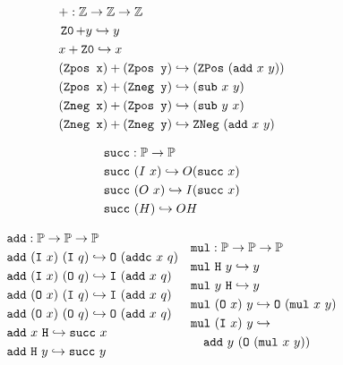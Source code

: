 \begin{definition}
{\footnotesize
\begin{align*}
&+: \bb{Z} \ra \bb{Z} \ra \bb{Z} \\
& \ZO + y \re y \\
& x + \ZO \re x \\
& (\tt{Zpos x}) + (\tt{Zpos y}) \re (\ZPos~(\tt{add}~x~y))  \\
& (\tt{Zpos x}) + (\tt{Zneg y}) \re (\tt{sub}~x~y)  \\
& (\tt{Zneg x}) + (\tt{Zpos y}) \re (\tt{sub}~y~x)  \\
& (\tt{Zneg x}) + (\tt{Zneg y}) \re \ZNeg~(\tt{add}~x~y)
\end{align*}
\noindent

\begin{align*}
& \kw{succ}: \bb{P} \ra \bb{P} \\
& \kw{succ}~(I~x) \re O (\kw{succ}~x) \\
& \kw{succ}~(O~x) \re I (\kw{succ}~x) \\
& \kw{succ}~(H) \re O H
\end{align*}

\[
\begin{array}[t]{ll}
\begin{aligned}
&\tt{add} : \bb{P} \ra \bb{P} \ra \bb{P} \\
& \tt{add}~(\tt{I}~x)~(\tt{I}~q) \re \tt{O}~(\tt{addc}~x~q) \\
& \tt{add}~(\tt{I}~x)~(\tt{O}~q) \re \tt{I}~(\tt{add}~x~q) \\
& \tt{add}~(\tt{O}~x)~(\tt{I}~q) \re \tt{I}~(\tt{add}~x~q) \\
& \tt{add}~(\tt{O}~x)~(\tt{O}~q) \re \tt{O}~(\tt{add}~x~q) \\
& \tt{add}~x~\tt{H} \re \tt{succ}~x \\
& \tt{add}~\tt{H}~y \re \tt{succ}~y \\
\end{aligned}
&
\begin{aligned}
&\tt{mul} : \bb{P} \ra \bb{P} \ra \bb{P} \\
& \tt{mul}~\tt{H}~y \re y \\
& \tt{mul}~y~\tt{H} \re y \\
& \tt{mul}~(\tt{O}~x)~y \re \tt{O}~(\tt{mul}~x~y) \\
& \tt{mul}~(\tt{I}~x)~y \re \\
& \quad \tt{add}~y~(\tt{O}~(\tt{mul}~x~y)) \\
\end{aligned}
\end{array}
\]
\noindent

}
\end{definition}

